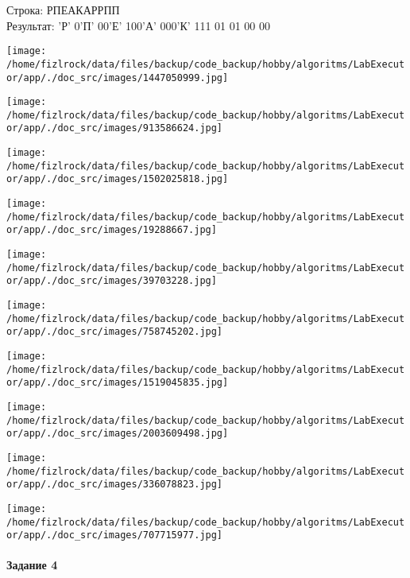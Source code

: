 \documentclass[a4paper, 12pt]{article}
\begin{document}
Строка: 
РПЕАКАРРПП\\
Результат: 'Р' 0'П' 00'Е' 100'А' 000'К' 111 01 01 00 00

\texttt{[image: /home/fizlrock/data/files/backup/code\_backup/hobby/algoritms/LabExecutor/app/./doc\_src/images/1447050999.jpg]}

\texttt{[image: /home/fizlrock/data/files/backup/code\_backup/hobby/algoritms/LabExecutor/app/./doc\_src/images/913586624.jpg]}

\texttt{[image: /home/fizlrock/data/files/backup/code\_backup/hobby/algoritms/LabExecutor/app/./doc\_src/images/1502025818.jpg]}

\texttt{[image: /home/fizlrock/data/files/backup/code\_backup/hobby/algoritms/LabExecutor/app/./doc\_src/images/19288667.jpg]}

\texttt{[image: /home/fizlrock/data/files/backup/code\_backup/hobby/algoritms/LabExecutor/app/./doc\_src/images/39703228.jpg]}

\texttt{[image: /home/fizlrock/data/files/backup/code\_backup/hobby/algoritms/LabExecutor/app/./doc\_src/images/758745202.jpg]}

\texttt{[image: /home/fizlrock/data/files/backup/code\_backup/hobby/algoritms/LabExecutor/app/./doc\_src/images/1519045835.jpg]}

\texttt{[image: /home/fizlrock/data/files/backup/code\_backup/hobby/algoritms/LabExecutor/app/./doc\_src/images/2003609498.jpg]}

\texttt{[image: /home/fizlrock/data/files/backup/code\_backup/hobby/algoritms/LabExecutor/app/./doc\_src/images/336078823.jpg]}

\texttt{[image: /home/fizlrock/data/files/backup/code\_backup/hobby/algoritms/LabExecutor/app/./doc\_src/images/707715977.jpg]}
\pagebreak
\paragraph{Задание 4}
\end{document}
